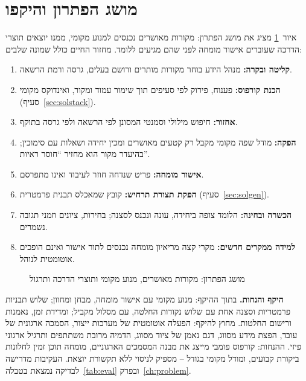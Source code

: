 \section{מושג הפתרון והיקפו}\label{sec:solconcept}
איור~\ref{fig:solconcept} מציג את מושג הפתרון: מקורות מאושרים נכנסים למנוע  מקומי, ממנו יוצאים תוצרי הדרכה שעוברים אישור מומחה לפני
שהם מגיעים ללומד. מחזור החיים כולל שמונה שלבים:
\begin{enumerate}[nosep]
  \item \textbf{קליטה ובקרה:} מנהל הידע בוחר מקורות מותרים ורושם בעלים, גרסה ורמת הרשאה.
  \item \textbf{הכנת קורפוס:} פענוח, פירוק לפי סעיפים תוך שימור עמוד ומקור, ואינדוקס מקומי (סעיף~\ref{sec:solstack}).
  \item \textbf{אחזור:} חיפוש מילולי וסמנטי המסונן לפי הרשאה ולפי גרסה בתוקף.
  \item \textbf{הפקה:} מודל שפה מקומי מקבל רק קטעים מאושרים ומכין יחידה ושאלות עם סימוכין; בהיעדר מקור הוא מחזיר “חוסר ראיות”.
  \item \textbf{אישור מומחה:} פריט שנדחה חוזר לעיבוד ואינו מתפרסם.
  \item \textbf{הפקת תצורת תרחיש:} קובץ  שמאכלס תבנית \threeD{} פרמטרית (סעיף~\ref{sec:solgen}).
  \item \textbf{הכשרה ובחינה:} הלומד צופה ביחידה, עונה ונכנס לסצנה; בחירות, ציונים וזמני תגובה נשמרים.
  \item \textbf{למידה ממקרים חדשים:} מקרי קצה מריאיון מומחה נכנסים לתור אישור ואינם הופכים אוטומטית לנוהל.
\end{enumerate}
\begin{figure}[!htbp]
\centering
{}
\caption{מושג הפתרון: מקורות מאושרים, מנוע  מקומי ותוצרי הדרכה ותרגול }\label{fig:solconcept}
\end{figure}
\textbf{היקף והנחות.} בתוך ההיקף: מנוע  מקומי עם אישור מומחה, מבחן ומחוון; שלוש תבניות \threeD{} פרמטריות וסצנה אחת עם שלוש נקודות החלטה, עם מסלול \twoD{} מקביל;
ומדידת זמן, נאמנות ורישום החלטות. מחוץ להיקף: הפעלה אוטומטית של מערכות ייצור, הסמכה ארגונית של עובד, הפצת מידע מסווג, דגם נאמן של ציוד מסווג,
הדמיה מרובת משתתפים ותרגיל ארגוני פיזי. ההנחות: קורפוס  פומבי מייצג את מבנה המסמכים הארגוניים, מומחה תוכן זמין לחלונות ביקורת קבועים, ומודל מקומי
בגודל -- מספיק לניסוי ללא תקשורת יוצאת. העקיבות מדרישה לבדיקה נמצאת בטבלה~\ref{tab:eval} ובפרק~\ref{ch:problem}.

